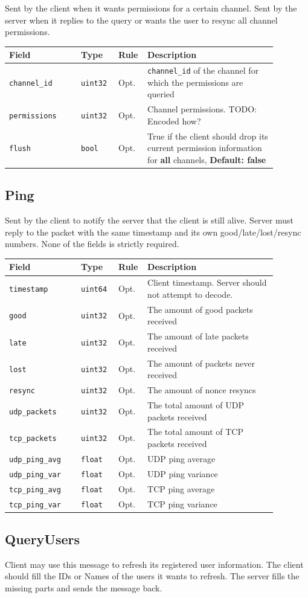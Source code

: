 \documentclass[11pt]{article} %
\newenvironment{mumbleMessageEx}
{%
	\small
	\renewcommand\arraystretch{1.5}
	\begin{tabular}{p{0.25\linewidth}p{0.13\linewidth}p{0.05\linewidth}p{0.45\linewidth}}
	Field & Type & Rule & Description \\
	\hline
}
{%
	\end{tabular}
	\renewcommand\arraystretch{1.0}
}
\newcommand{\mumbleMessageExItem}[4]{ \texttt{#1} & \texttt{#2} & #3 & #4 \\ }
\begin{document}
Sent by the client when it wants permissions for a certain channel. Sent by the server when it replies to the query or wants the user to resync all channel permissions.

\begin{mumbleMessageEx}
\mumbleMessageExItem{channel\_id}{uint32}{Opt.}{\texttt{channel\_id} of the channel for which the permissions are queried}
\mumbleMessageExItem{permissions}{uint32}{Opt.}{Channel permissions. TODO: Encoded how?}
\mumbleMessageExItem{flush}{bool}{Opt.}{True if the client should drop its current permission information for \textbf{all} channels, \textbf{Default: false}}
\end{mumbleMessageEx}

\subsection{Ping}
\label{msg:ping}

Sent by the client to notify the server that the client is still alive. Server must reply to the packet with the same timestamp and its own good/late/lost/resync numbers. None of the fields is strictly required.

\begin{mumbleMessageEx}
\mumbleMessageExItem{timestamp}{uint64}{Opt.}{Client timestamp. Server should not attempt to decode.}
\mumbleMessageExItem{good}{uint32}{Opt.}{The amount of good packets received}
\mumbleMessageExItem{late}{uint32}{Opt.}{The amount of late packets received}
\mumbleMessageExItem{lost}{uint32}{Opt.}{The amount of packets never received}
\mumbleMessageExItem{resync}{uint32}{Opt.}{The amount of nonce resyncs}
\mumbleMessageExItem{udp\_packets}{uint32}{Opt.}{The total amount of UDP packets received}
\mumbleMessageExItem{tcp\_packets}{uint32}{Opt.}{The total amount of TCP packets received}
\mumbleMessageExItem{udp\_ping\_avg}{float}{Opt.}{UDP ping average}
\mumbleMessageExItem{udp\_ping\_var}{float}{Opt.}{UDP ping variance}
\mumbleMessageExItem{tcp\_ping\_avg}{float}{Opt.}{TCP ping average}
\mumbleMessageExItem{tcp\_ping\_var}{float}{Opt.}{TCP ping variance}
\end{mumbleMessageEx}

\subsection{QueryUsers}
\label{msg:queryUsers}

Client may use this message to refresh its registered user information. The client should fill the IDs or Names of the users it wants to refresh. The server fills the missing parts and sends the message back.
\end{document}
